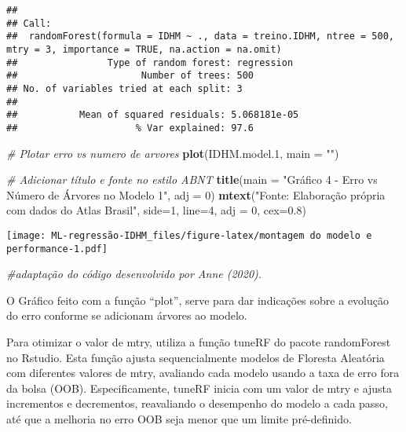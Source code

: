 \documentclass[
]{article}
\newenvironment{Shaded}{\begin{snugshade}}{\end{snugshade}}
\newcommand{\AttributeTok}[1]{\textcolor[rgb]{0.13,0.29,0.53}{#1}}
\newcommand{\CommentTok}[1]{\textcolor[rgb]{0.56,0.35,0.01}{\textit{#1}}}
\newcommand{\DecValTok}[1]{\textcolor[rgb]{0.00,0.00,0.81}{#1}}
\newcommand{\FloatTok}[1]{\textcolor[rgb]{0.00,0.00,0.81}{#1}}
\newcommand{\FunctionTok}[1]{\textcolor[rgb]{0.13,0.29,0.53}{\textbf{#1}}}
\newcommand{\NormalTok}[1]{#1}
\newcommand{\StringTok}[1]{\textcolor[rgb]{0.31,0.60,0.02}{#1}}
\begin{document}
\begin{verbatim}
## 
## Call:
##  randomForest(formula = IDHM ~ ., data = treino.IDHM, ntree = 500,      mtry = 3, importance = TRUE, na.action = na.omit) 
##                Type of random forest: regression
##                      Number of trees: 500
## No. of variables tried at each split: 3
## 
##           Mean of squared residuals: 5.068181e-05
##                     % Var explained: 97.6
\end{verbatim}

\begin{Shaded}
\begin{Highlighting}[]
\CommentTok{\# Plotar erro vs numero de arvores }
\FunctionTok{plot}\NormalTok{(IDHM.model}\FloatTok{.1}\NormalTok{, }\AttributeTok{main =} \StringTok{""}\NormalTok{)}

\CommentTok{\# Adicionar título e fonte no estilo ABNT}
\FunctionTok{title}\NormalTok{(}\AttributeTok{main =} \StringTok{"Gráfico 4 {-} Erro vs Número de Árvores no Modelo 1"}\NormalTok{, }\AttributeTok{adj =} \DecValTok{0}\NormalTok{)}
\FunctionTok{mtext}\NormalTok{(}\StringTok{"Fonte: Elaboração própria com dados do Atlas Brasil"}\NormalTok{, }\AttributeTok{side=}\DecValTok{1}\NormalTok{, }\AttributeTok{line=}\DecValTok{4}\NormalTok{, }\AttributeTok{adj =} \DecValTok{0}\NormalTok{, }\AttributeTok{cex=}\FloatTok{0.8}\NormalTok{)}
\end{Highlighting}
\end{Shaded}

\texttt{[image: ML-regressão-IDHM\_files/figure-latex/montagem do modelo e performance-1.pdf]}

\begin{Shaded}
\begin{Highlighting}[]
\CommentTok{\#adaptação do código desenvolvido por Anne (2020).}
\end{Highlighting}
\end{Shaded}

O Gráfico feito com a função ``plot'', serve para dar indicações sobre a
evolução do erro conforme se adicionam árvores ao modelo.

Para otimizar o valor de mtry, utiliza a função tuneRF do pacote
randomForest no Rstudio. Esta função ajusta sequencialmente modelos de
Floresta Aleatória com diferentes valores de mtry, avaliando cada modelo
usando a taxa de erro fora da bolsa (OOB). Especificamente, tuneRF
inicia com um valor de mtry e ajusta incrementos e decrementos,
reavaliando o desempenho do modelo a cada passo, até que a melhoria no
erro OOB seja menor que um limite pré-definido.
\end{document}
